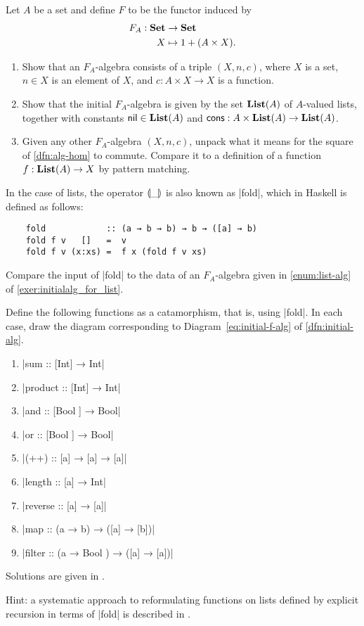 \begin{exer}\label{exer:initialalg_for_list}
  Let $A$ be a set and define $F$ to be the functor induced by 
\begin{align*}
  F_A:\mathbf{Set} &\to\mathbf{Set}
\\
  X &\mapsto 1 + (A\times X).
\end{align*}

\begin{enumerate}
\item \label{enum:list-alg} Show that an $F_A$-algebra consists of a triple $(X,n,c)$, where $X$ is a set, $n\in X$ is an element of $X$, and $c : A \times X \to X$ is a function.
\item Show that the initial $F_A$-algebra is given by the set $\mathbf{List}(A)$ of $A$-valued lists, together with constants $\mathsf{nil} \in \mathbf{List}(A)$ and $\mathsf{cons} : A \times \mathbf{List}(A) \to \mathbf{List}(A)$.
\item Given any other $F_A$-algebra $(X,n,c)$, unpack what it means for the square of \cref{dfn:alg-hom} to commute.
Compare it to a definition of a function $f : \mathbf{List}(A) \to X$ by pattern matching.
\end{enumerate}

\end{exer}

\begin{rem}
  In the case of lists, the operator $\llparenthesis \_ \rrparenthesis$ is also known as |fold|, which in Haskell is defined as follows:
  \begin{lstlisting}
    fold            :: (a → b → b) → b → ([a] → b)
    fold f v   []   =  v
    fold f v (x:xs) =  f x (fold f v xs)
  \end{lstlisting}
  Compare the input of |fold| to the data of an $F_A$-algebra given in \cref{enum:list-alg} of \cref{exer:initialalg_for_list}.
\end{rem}


\begin{exer}\label{exer:list-functions-as-fold}
  Define the following functions as a catamorphism, that is, using |fold|.
  In each case, draw the diagram corresponding to Diagram~\ref{eq:initial-f-alg} of \cref{dfn:initial-alg}.
  \begin{enumerate}
  \item |sum :: [Int] →  Int|
  \item |product :: [Int] →  Int|
  \item |and :: [Bool ] →  Bool|
  \item |or :: [Bool ] →  Bool|
  \item |(++) :: [a] →  [a] →  [a]|
  \item |length :: [a] →  Int|
  \item |reverse :: [a] →  [a]|
  \item |map :: (a →  b) →  ([a] →  [b])|
  \item |filter :: (a →  Bool ) →  ([a] →  [a])|
  \end{enumerate}
  Solutions are given in \cite[\S2]{DBLP:journals/jfp/Hutton99}.

  Hint: a systematic approach to reformulating functions on lists defined by explicit recursion in terms of |fold| is described in \cite[\S3.3]{DBLP:journals/jfp/Hutton99}.
\end{exer}



